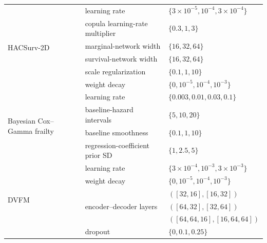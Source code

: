 \begin{table}[!ht]
\begin{tabular}{@{}llp{}@{}}
\midrule
\multirow{6}{*}{HACSurv-2D}
& learning rate & $\{3\!\times\!10^{-5},10^{-4},3\!\times\!10^{-4}\}$ \\
& copula learning-rate multiplier & $\{0.3,1,3\}$ \\
& marginal-network width & $\{16,32,64\}$ \\
& survival-network width & $\{16,32,64\}$ \\
& scale regularization & $\{0.1,1,10\}$ \\
& weight decay & $\{0,10^{-5},10^{-4},10^{-3}\}$ \\
\midrule
\multirow{4}{*}{Bayesian Cox--Gamma frailty}
& learning rate & $\{0.003,0.01,0.03,0.1\}$ \\
& baseline-hazard intervals & $\{5,10,20\}$ \\
& baseline smoothness & $\{0.1,1,10\}$ \\
& regression-coefficient prior SD & $\{1,2.5,5\}$ \\
\midrule
\multirow{6}{*}{DVFM}
& learning rate & $\{3\!\times\!10^{-4},10^{-3},3\!\times\!10^{-3}\}$ \\
& weight decay & $\{0,10^{-5},10^{-4},10^{-3}\}$ \\
& \multirow{3}{*}{encoder--decoder layers} & $([32,16],[16,32])$ \\
& & $([64,32],[32,64])$ \\
& & $([64,64,16],[16,64,64])$ \\
& dropout & $\{0,0.1,0.25\}$ \\
\bottomrule
\end{tabular}
\end{table}

